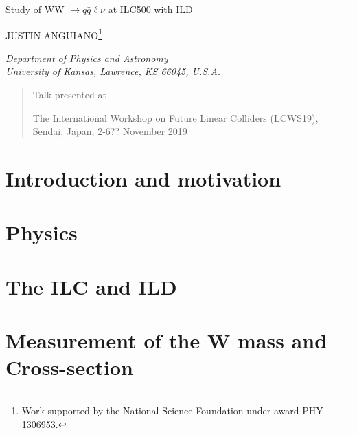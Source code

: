 \documentclass[12pt]{article}
\newcommand\pubnumber{}
\newcommand\pubdate{\today}
\def\kansas{Department of Physics and Astronomy\\
University of Kansas, Lawrence, KS 66045, U.S.A.}
\def\support{\footnote{Work supported by the National Science Foundation  
                       under award PHY-1306953.}}
\def\Title#1{\begin{center} {\Large #1 } \end{center}}
\def\Author#1{\begin{center}{ \sc #1} \end{center}}
\def\Address#1{\begin{center}{ \it #1} \end{center}}
\newcommand\pubblock{\rightline{\begin{tabular}{l} \pubnumber\\
         \pubdate  \end{tabular}}}
\newenvironment{Abstract}{\begin{quotation}  }{\end{quotation}}
\newenvironment{Presented}{\begin{quotation} \begin{center} 
             Talk presented at \end{center}\bigskip 
      \begin{center}\begin{large}}{\end{large}\end{center} \end{quotation}}
\begin{document}
\begin{titlepage}
\pubblock

\vfill
\Title{Study of WW $\rightarrow q\bar{q}\ell\nu$ at ILC500 with ILD }
\vfill
\Author{JUSTIN ANGUIANO\support}
\Address{\kansas}
\vfill
\begin{Abstract}

\end{Abstract}
\vfill
\begin{Presented}
The International Workshop on Future Linear Colliders (LCWS19),\\
Sendai, Japan, 2-6?? November 2019\\
\end{Presented}
\vfill
\end{titlepage}
\def\thefootnote{\fnsymbol{footnote}}
\setcounter{footnote}{0}
%



\section{Introduction and motivation}
\label{sec:Introduction}

\section{Physics}
\label{sec:physics}






\section{The ILC and ILD}
\label{sec:ILC_detector}



\section{Measurement of the W mass and Cross-section}
\label{Current_Work} 
\end{document}
